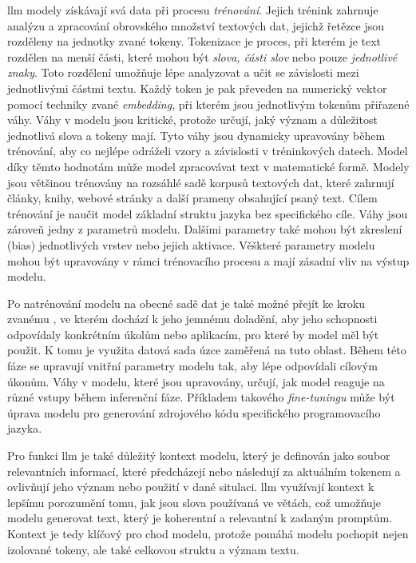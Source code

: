 \documentclass[czech, ma, kiv, he, iso690numb, pdf, viewonly]{fasthesis}
\begin{document}
    \Gls{llm} modely získávají svá data při procesu \textit{trénování}. Jejich trénink zahrnuje analýzu a zpracování obrovského množství textových dat, jejichž řetězce jsou rozděleny na jednotky zvané \gls{token}y. Tokenizace je proces, při kterém je text rozdělen na menší části, které mohou být \textit{slova, části slov} nebo pouze \textit{jednotlivé znaky}. Toto rozdělení umožňuje lépe analyzovat a učit se závislosti mezi jednotlivými částmi textu. Každý token je pak převeden na numerický vektor pomocí techniky zvané \emph{embedding}, při kterém jsou jednotlivým tokenům přiřazené váhy. Váhy v modelu jsou kritické, protože určují, jaký význam a důležitost jednotlivá slova a tokeny mají. Tyto váhy jsou dynamicky upravovány během trénování, aby co nejlépe odráželi vzory a závislosti v tréninkových datech. Model díky těmto hodnotám může model zpracovávat text v matematické formě. Modely jsou většinou trénovány na rozsáhlé sadě korpusů textových dat, které zahrnují články, knihy, webové stránky a další prameny obsahující psaný text. Cílem trénování je naučit model základní struktu jazyka bez specifického cíle. Váhy jsou zároveň jedny z parametrů modelu. Dalšími parametry také mohou být zkreslení (bias) jednotlivých vrstev nebo jejich aktivace. Věškteré parametry modelu mohou být upravovány v rámci trénovacího procesu a mají zásadní vliv na výstup modelu. \cite{prazak2022embedding} \cite{prazak2022seq2seq}

    \pagebreak
    Po natrénování modelu na obecné sadě dat je také možné přejít ke kroku zvanému , ve kterém dochází k jeho jemnému doladění, aby jeho schopnosti odpovídaly konkrétním úkolům nebo aplikacím, pro které by model měl být použit. K tomu je využita datová sada úzce zaměřená na tuto oblast. Během této fáze se upravují vnitřní parametry modelu tak, aby lépe odpovídali cílovým úkonům. Váhy v modelu, které jsou upravovány, určují, jak model reaguje na různé vstupy během inferenční fáze. Příkladem takového \textit{fine-tuningu} může být úprava modelu pro generování zdrojového kódu specifického programovacího jazyka.

    Pro funkci \Gls{llm} je také důležitý kontext modelu, který je definován jako soubor relevantních informací, které předcházejí nebo následují za aktuálním tokenem a ovlivňují jeho význam nebo použití v dané situlaci. \Gls{llm} využívají kontext k lepšímu porozumění tomu, jak jsou slova používaná ve větách, což umožňuje modelu generovat text, který je koherentní a relevantní k zadaným promptům. Kontext je tedy klíčový pro chod modelu, protože pomáhá modelu pochopit nejen izolované tokeny, ale také celkovou struktu a význam textu.
\end{document}
